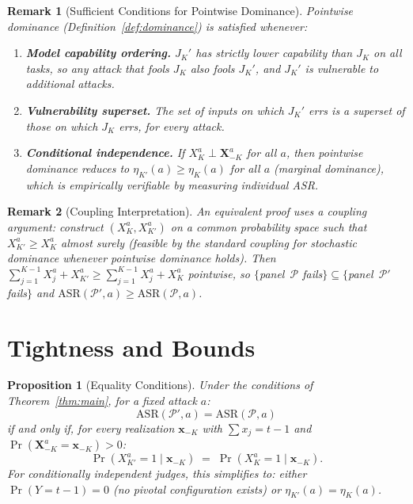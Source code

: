 \documentclass[11pt]{article}
\newtheorem{proposition}[theorem]{Proposition}
\newtheorem*{remark}{Remark}
\begin{document}
\begin{remark}[Sufficient Conditions for Pointwise Dominance]
Pointwise dominance (Definition~\ref{def:dominance}) is satisfied whenever:
\begin{enumerate}[label=(\roman*)]
    \item \textbf{Model capability ordering.} $J_K'$ has strictly lower capability than $J_K$ on all tasks, so any attack that fools $J_K$ also fools $J_K'$, and $J_K'$ is vulnerable to additional attacks.
    \item \textbf{Vulnerability superset.} The set of inputs on which $J_K'$ errs is a superset of those on which $J_K$ errs, for every attack.
    \item \textbf{Conditional independence.} If $X_K^a \perp \mathbf{X}_{-K}^a$ for all $a$, then pointwise dominance reduces to $\eta_{K'}(a) \geq \eta_K(a)$ for all $a$ (marginal dominance), which is empirically verifiable by measuring individual ASR.
\end{enumerate}
\end{remark}

\begin{remark}[Coupling Interpretation]
An equivalent proof uses a coupling argument: construct $(X_K^a, X_{K'}^a)$ on a common probability space such that $X_{K'}^a \geq X_K^a$ almost surely (feasible by the standard coupling for stochastic dominance whenever pointwise dominance holds). Then $\sum_{j=1}^{K-1} X_j^a + X_{K'}^a \geq \sum_{j=1}^{K-1} X_j^a + X_K^a$ pointwise, so $\{$panel~$\mathcal{P}$ fails$\} \subseteq \{$panel~$\mathcal{P}'$ fails$\}$ and $\mathrm{ASR}(\mathcal{P}', a) \geq \mathrm{ASR}(\mathcal{P}, a)$.
\end{remark}


\section{Tightness and Bounds}

\begin{proposition}[Equality Conditions]\label{prop:tight}
Under the conditions of Theorem~\ref{thm:main}, for a fixed attack $a$:
\[
    \mathrm{ASR}(\mathcal{P}', a) = \mathrm{ASR}(\mathcal{P}, a)
\]
if and only if, for every realization $\mathbf{x}_{-K}$ with $\sum x_j = t{-}1$ and $\Pr(\mathbf{X}_{-K}^a = \mathbf{x}_{-K}) > 0$:
\[
    \Pr(X_{K'}^a = 1 \mid \mathbf{x}_{-K}) \;=\; \Pr(X_K^a = 1 \mid \mathbf{x}_{-K}).
\]
For conditionally independent judges, this simplifies to: either $\Pr(Y = t{-}1) = 0$ (no pivotal configuration exists) or $\eta_{K'}(a) = \eta_K(a)$.
\end{proposition}
\end{document}
